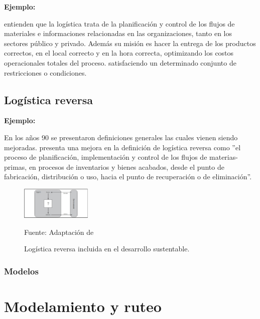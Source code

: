 {\bf Ejemplo:}\par

\cite{Ghiani} entienden que la logística trata de la planificación y control de los flujos de materiales e informaciones relacionadas en las organizaciones, tanto en los sectores público y privado. Además su misión es hacer la entrega de los productos correctos, en el local correcto y en la hora correcta, optimizando los costos operacionales totales del proceso.
satisfaciendo un determinado conjunto de restricciones o condiciones.\par

\subsection{Logística reversa}

{\bf Ejemplo:}\par

En los años 90 se presentaron definiciones generales las cuales vienen siendo mejoradas. \cite{Dekker} presenta una mejora en la definición de logística reversa como  ”el proceso de planificación, implementación y control de los flujos de materias-primas, en procesos de inventarios y bienes acabados, desde el punto de fabricación, distribución o uso, hacia el punto de recuperación o de eliminación”. 
\begin{figure}[ht]
\begin{center}
\includegraphics[width=0.3\textwidth]{image/Figura1}
\end{center}
\begin{center}
\vskip -0.5cm
\caption{\small{Logística reversa incluida en el desarrollo sustentable.}}
{\small{Fuente: Adaptación de \cite{Tanguay}}}
\end{center}
\end{figure}


\subsubsection{Modelos}

\section{Modelamiento y ruteo }

